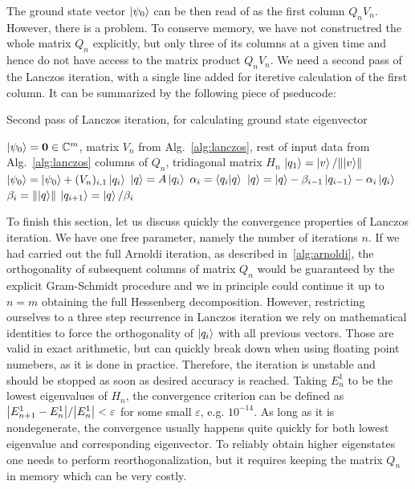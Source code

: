 The ground state vector \(\ket{\psi_0}\) can be then read of as the first column \(Q_n V_n\). However, there is a problem.
To conserve memory, we have not constructred the whole matrix \(Q_n\) explicitly, but only three of its columns 
at a given time and hence do not have access to the matrix product \(Q_n V_n\). We need a second pass of the Lanczos
iteration, with a single line added for iteretive calculation of the first column. It can be summarized by the
following piece of pseducode:

\begin{algorithm}
	\algrenewcommand{}
	\algrenewcommand{}
	\caption{Second pass of Lanczos iteration, for calculating ground state eigenvector}
	\label{alg:lanczos_second_pass}
	\begin{algorithmic}[1]
	\Require \(\ket{\psi_0} = \vectorbold{0} \in \CC^m\), matrix \(V_n\) from Alg.~\ref{alg:lanczos}, rest of input data from Alg.~\ref{alg:lanczos}
		\Ensure columns of \(Q_n\), tridiagonal matrix \(H_n\)
		\State \(\ket{q_1} = \ket{v}/\norm*{\ket{v}}\)
			\State \(\ket{\psi_0} = \ket{\psi_0} + (V_n)_{i,1}\ket{q_i}\) 
			\State \(\ket{q} = A\ket{q_i}\)
			\State \(\alpha_i = \braket{q_i}{q}\)
			\State \(\ket{q} = \ket{q} - \beta_{i-1}\ket{q_{i-1}} - \alpha_i \ket{q_i}\)
			\State \(\beta_i = \norm{\ket{q}} \) 
			\State \(\ket{q_{i+1}} = \ket{q}/\beta_i \)
		\EndFor
	\end{algorithmic}
\end{algorithm}

To finish this section, let us discuss quickly the convergence properties of Lanczos iteration. We have one free parameter,
namely the number of iterations \(n\). If we had carried out the full Arnoldi iteration, as described in~\ref{alg:arnoldi},
the orthogonality of subsequent columns of matrix \(Q_n\) would be guaranteed by the explicit Gram-Schmidt procedure
and we in principle could continue it up to \(n = m\) obtaining the full Hessenberg decomposition. However, 
restricting ourselves to a three step recurrence in Lanczos iteration we rely on mathematical identities to
force the orthogonality of \(\ket{q_i}\) with all previous vectors. Those are valid in exact arithmetic, but can
quickly break down when using floating point numebers, as it is done in practice. Therefore, the iteration is unstable and
should be stopped as soon as desired accuracy is reached. Taking \(E_n^1\) to be the lowest eigenvalues of
\(H_n\), the convergence criterion can be defined as \(\abs{E_{n+1}^1 - E_{n}^1}/\abs{E_n^1} < \varepsilon\) for some
small \(\varepsilon\), e.g. \(10^{-14}\). As long as it is nondegenerate, the convergence usually happens quite quickly for
both lowest eigenvalue and corresponding eigenvector. To reliably obtain higher eigenstates one needs to perform
reorthogonalization, but it requires keeping the matrix \(Q_n\) in memory which can be very costly.

